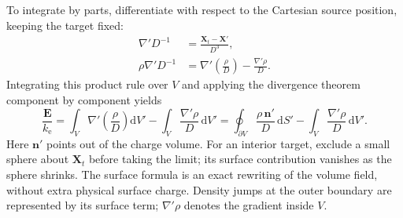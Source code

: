 \documentclass[10pt,a4paper]{article}
\newcommand{\dd}{\mathrm d}
\newcommand{\kC}{k_{\mathrm e}}
\begin{document}
To integrate by parts, differentiate with respect to the Cartesian source
position, keeping the target fixed:
\begin{align}
 \nabla' D^{-1}&=\frac{\mathbf X_t-\mathbf X'}{D^3},\\
 \rho\nabla' D^{-1}&=\nabla'\!\left(\frac{\rho}{D}\right)
                      -\frac{\nabla'\rho}{D}.
\end{align}
Integrating this product rule over $V$ and applying the divergence theorem
component by component yields
\begin{equation}
 \frac{\mathbf E}{\kC}
 =\int_V\nabla'\!\left(\frac{\rho}{D}\right)\dd V'
  -\int_V\frac{\nabla'\rho}{D}\,\dd V'
 =\oint_{\partial V}\frac{\rho\,\mathbf n'}{D}\,\dd S'
  -\int_V\frac{\nabla'\rho}{D}\,\dd V'.
 \label{eq:sacr-surface}
\end{equation}
Here $\mathbf n'$ points out of the charge volume. For an interior target,
exclude a small sphere about $\mathbf X_t$ before taking the limit; its
surface contribution vanishes as the sphere shrinks. The surface formula
is an exact rewriting of the volume field, without extra physical surface
charge. Density jumps at the outer boundary are represented by its surface
term; $\nabla'\rho$ denotes the gradient inside $V$.
\end{document}
